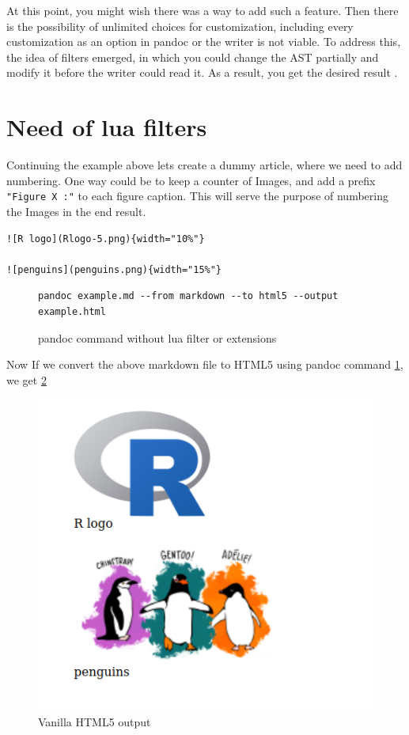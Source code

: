 At this point, you might wish there was a way to add such a feature. Then there is the possibility of unlimited choices for customization, including every customization as an option in pandoc or the writer is not viable. 
To address this, the idea of filters emerged, in which you could change the AST partially and modify it before the writer could read it. As a result, you get the desired result \citep{pandocfilters}.

\section{Need of lua filters}

Continuing the example above lets create a dummy article, where we need to add
numbering. One way could be to keep a counter of Images, and add a prefix \verb|"Figure X :"|
to each figure caption. This will serve the purpose of numbering the Images in the end result.

\begin{verbatim}
![R logo](Rlogo-5.png){width="10%"}

![penguins](penguins.png){width="15%"}

\end{verbatim}

\begin{figure}[htbp]
\begin{verbatim}
pandoc example.md --from markdown --to html5 --output example.html
\end{verbatim}
\caption{pandoc command without lua filter or extensions}
\label{code:2}
\end{figure}

Now If we convert the above markdown file to HTML5 using pandoc command \ref{code:2}, we get \ref{fig:1}


\begin{figure}[!htbp]
\centering
\includegraphics[width=0.5\linewidth]{figures/example.png}
\caption{Vanilla HTML5 output}
\label{fig:1}
\end{figure}

